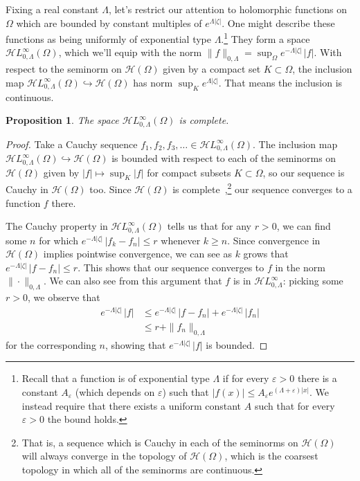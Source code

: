 \documentclass{article}
\theoremstyle{plain}
\newtheorem{prop}{Proposition}
\newcommand{\holo}{\mathcal{H}}
\newcommand{\singexp}[2]{\mathcal{H}L^\infty_{#1, #2}}
\begin{document}
Fixing a real constant $\Lambda$, let's restrict our attention to holomorphic functions on $\Omega$ which are bounded by constant multiples of $e^{\Lambda|\zeta|}$. One might describe these functions as being uniformly of exponential type $\Lambda$.\footnote{Recall that a function is of exponential type $\Lambda$ if for every $\varepsilon>0$ there is a constant $A_\varepsilon$ (which depends on $\varepsilon$) such that $|f(x)|\leq A_\varepsilon e^{(\Lambda+\varepsilon)|x|}$. We instead require that there exists a uniform constant $A$ such that for every $\varepsilon>0$ the bound holds.} They form a space $\singexp{0}{\Lambda}(\Omega)$, which we'll equip with the norm $\|f\|_{0,\Lambda} = \sup_\Omega e^{-\Lambda|\zeta|}\,|f|$. With respect to the seminorm on $\holo(\Omega)$ given by a compact set $K \subset \Omega$, the inclusion map $\singexp{0}{\Lambda}(\Omega) \hookrightarrow \holo(\Omega)$ has norm $\sup_K e^{\Lambda |\zeta|}$. That means the inclusion is continuous.
\begin{prop}\label{exp-complete}
The space $\singexp{0}{\Lambda}(\Omega)$ is complete.
\end{prop}
\begin{proof}
Take a Cauchy sequence $f_1, f_2, f_3, \ldots \in \singexp{0}{\Lambda}(\Omega)$. The inclusion map $\singexp{0}{\Lambda}(\Omega) \hookrightarrow \holo(\Omega)$ is bounded with respect to each of the seminorms on $\holo(\Omega)$ given by $|f| \mapsto \sup_K |f|$ for compact subsets $K \subset \Omega$, so our sequence is Cauchy in $\holo(\Omega)$ too. Since $\holo(\Omega)$ is complete~\cite[Proposition~3.5]{fnl-cpx-anal},\footnote{That is, a sequence which is Cauchy in each of the seminorms on $\holo(\Omega)$ will always converge in the topology of $\holo(\Omega)$, which is the coarsest topology in which all of the seminorms are continuous.} our sequence converges to a function $f$ there.

The Cauchy property in $\singexp{0}{\Lambda}(\Omega)$ tells us that for any $r > 0$, we can find some $n$ for which $e^{-\Lambda |\zeta|}\,|f_k - f_n| \le r$ whenever $k \ge n$. Since convergence in $\holo(\Omega)$ implies pointwise convergence, we can see as $k$ grows that $e^{-\Lambda |\zeta|}\,|f - f_n| \le r$. This shows that our sequence converges to $f$ in the norm $\|\cdot\|_{0,\Lambda}$. We can also see from this argument that $f$ is in $\singexp{0}{\Lambda}$: picking some $r > 0$, we observe that
\begin{align*}
e^{-\Lambda |\zeta|}\,|f| & \le e^{-\Lambda |\zeta|}\,|f - f_n| + e^{-\Lambda |\zeta|}\,|f_n| \\
& \le r + \|f_n\|_{0,\Lambda}
\end{align*}
for the corresponding $n$, showing that $e^{-\Lambda |\zeta|}\,|f|$ is bounded.

\end{proof}
\end{document}
